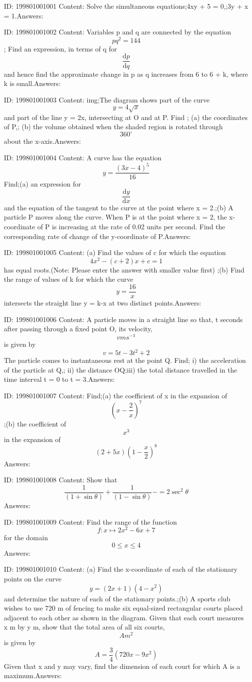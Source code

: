 \documentclass{article}
\begin{document}
ID: 199801001001
Content:
Solve the simultaneous equations;4xy + 5 = 0,;3y + x = 1.Answers:

ID: 199801001002
Content:
Variables p and q are connected by the equation \[pq^2=144\]; Find an expression, in terms of q for \[\frac{\mathrm{d} p}{\mathrm{d} q}\] and hence find the approximate change in p as q increases from 6 to 6 + k, where k is small.Answers:

ID: 199801001003
Content:
img;The diagram shows part of the curve \[y=4\sqrt{x}\] and part of the line y = 2x, intersecting at O and at P. Find ; (a)	the coordinates of P,; (b)	the volume obtained when the shaded region is rotated through \[360^{\circ}\]  about the x-axis.Answers:

ID: 199801001004
Content:
A curve has the equation \[y=\frac{(3x-4)^5}{16}\]  Find;(a) an expression for  \[\frac{\mathrm{d} y}{\mathrm{d} x}\] and the equation of the tangent to the curve at the point where x = 2.;(b) A particle P moves along the curve. When P is at the point where x = 2, the x-coordinate of P is increasing at the rate of 0.02 units per second. Find the corresponding rate of change of the y-coordinate of P.Answers:

ID: 199801001005
Content:
(a)	Find the values of c for which the equation  \[4x^2-(c+2)x+c=1\] has equal roots.(Note: Please enter the answer with smaller value first) ;(b)	Find the range of values of k for which the curve \[y=\frac{16}{x}\] intersects the straight line y = k-x at two distinct points.Answers:

ID: 199801001006
Content:
A particle moves in a straight line so that, t seconds after passing through a fixed point O, its velocity, \[vms^{-1}\] is given by \[v=5t-3t^2+2\] The particle comes to instantaneous rest at the point Q. Find; i) the acceleration of the particle at Q,; ii) the distance OQ;iii) the total distance travelled in the time interval t = 0 to t = 3.Answers:

ID: 199801001007
Content:
Find;(a)	the coefficient of x in the expansion of \[(x-\frac{2}{x})^7\];(b)	the coefficient of \[x^3\]in the expansion of \[(2+5x)(1-\frac{x}{2})^8\]Answers:

ID: 199801001008
Content:
Show that \[\frac{1}{(1+\sin\theta)}+\frac{1}{(1-\sin\theta)}-=2\sec^2\theta\]Answers:

ID: 199801001009
Content:
Find the range of the function \[f:x \mapsto 2x^2-6x+7\] for the domain \[0\leq x\leq 4\]Answers:

ID: 199801001010
Content:
(a) Find the x-coordinate of each of the stationary points on the curve \[y=(2x+1)(4-x^2)\] and determine the nature of each of the stationary points.;(b) A sports club wishes to use 720 m of fencing to make six equal-sized rectangular courts placed adjacent to each other as shown in the diagram. Given that each court measures x m by y m, show that the total area of all six courts, \[A m^2\] is given by \[A=\frac{3}{4}(720x-9x^2)\] Given that x and y may vary, find the dimension of each court for which A is a maximum.Answers:
\end{document}
